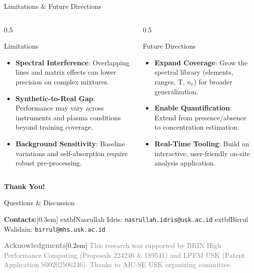 \documentclass{beamer}
\def\\{}%
\begin{document}
\begin{frame}{Limitations \& Future Directions}
  \begin{columns}[T,onlytextwidth]
    \begin{column}{0.5\textwidth}
      \begin{alertblock}{Limitations}
        \begin{itemize}\setlength{\itemsep}{2pt}\setlength{\parskip}{0pt}
          \item \textbf{Spectral Interference}: Overlapping lines and matrix effects can lower precision on complex mixtures.
          \item \textbf{Synthetic-to-Real Gap}: Performance may vary across instruments and plasma conditions beyond training coverage.
          \item \textbf{Background Sensitivity}: Baseline variations and self-absorption require robust pre-processing.
        \end{itemize}
      \end{alertblock}
    \end{column}
    \begin{column}{0.5\textwidth}
      \begin{exampleblock}{Future Directions}
        \begin{itemize}\setlength{\itemsep}{2pt}\setlength{\parskip}{0pt}
          \item \textbf{Expand Coverage}: Grow the spectral library (elements, ranges, T, $n_e$) for broader generalization.
          \item \textbf{Enable Quantification}: Extend from presence/absence to concentration estimation.
          \item \textbf{Real-Time Tooling}: Build an interactive, user-friendly on-site analysis application.
        \end{itemize}
      \end{exampleblock}
    \end{column}
  \end{columns}
\end{frame}
\begin{frame}{}
  \centering
  \vspace{0.5em}
  {\Huge \textcolor{uskGold}{\textbf{Thank You!}}}

  \vspace{0.6em}
  {\Large Questions \& Discussion}

  \vspace{1.0em}
  {\large \textcolor{uskGold}{\textbf{Contacts:}}}\\[0.3em]
  {\small
    	extbf{Nasrullah Idris:} \texttt{nasrullah.idris@usk.ac.id}\\
    	extbf{Birrul Walidain:} \texttt{birrul@mhs.usk.ac.id}
  }

  \vfill
  {\footnotesize \textcolor{gray}{\textbf{Acknowledgments}}}\\[0.2em]
  {\scriptsize \textcolor{gray}{This research was supported by BRIN High Performance Computing (Proposals 224246 \& 189541) and LPPM USK (Patent Application S00202506246). Thanks to AIC-SE USK organizing committee.}}
\end{frame}
\end{document}
